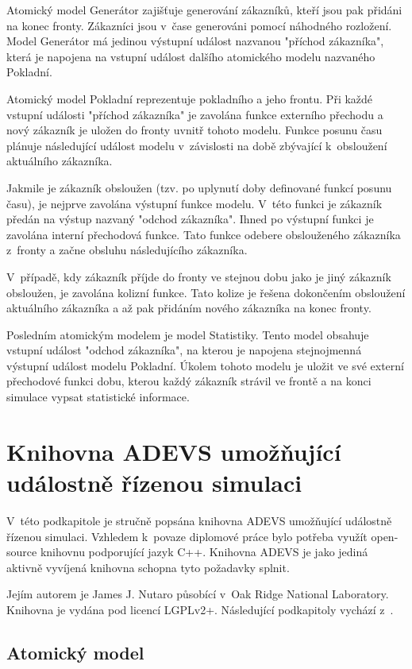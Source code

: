 Atomický model Generátor zajišťuje generování zákazníků, kteří jsou pak přidáni na konec fronty. Zákazníci jsou v~čase generováni pomocí náhodného rozložení. Model Generátor má jedinou výstupní událost nazvanou "příchod zákazníka", která je napojena na vstupní událost dalšího atomického modelu nazvaného Pokladní.

Atomický model Pokladní reprezentuje pokladního a jeho frontu. Při každé vstupní události "příchod zákazníka" je zavolána funkce externího přechodu a nový zákazník je uložen do fronty uvnitř tohoto modelu. Funkce posunu času plánuje následující událost modelu v~závislosti na době zbývající k~obsloužení aktuálního zákazníka.

Jakmile je zákazník obsloužen (tzv. po uplynutí doby definované funkcí posunu času), je nejprve zavolána výstupní funkce modelu. V~této funkci je zákazník předán na výstup nazvaný "odchod zákazníka". Ihned po výstupní funkci je zavolána interní přechodová funkce. Tato funkce odebere obslouženého zákazníka z~fronty a začne obsluhu následujícího zákazníka.

V~případě, kdy zákazník příjde do fronty ve stejnou dobu jako je jiný zákazník obsloužen, je zavolána kolizní funkce. Tato kolize je řešena dokončením obsloužení aktuálního zákazníka a až pak přidáním nového zákazníka na konec fronty.

Posledním atomickým modelem je model Statistiky. Tento model obsahuje vstupní událost "odchod zákazníka", na kterou je napojena stejnojmenná výstupní událost modelu Pokladní. Úkolem tohoto modelu je uložit ve své externí přechodové funkci dobu, kterou každý zákazník strávil ve frontě a na konci simulace vypsat statistické informace.

\section{Knihovna ADEVS umožňující událostně řízenou simulaci}

V~této podkapitole je stručně popsána knihovna ADEVS umožňující událostně řízenou simulaci. Vzhledem k~povaze diplomové práce bylo potřeba využít open-source knihovnu podporující jazyk C++. Knihovna ADEVS je jako jediná aktivně vyvíjená knihovna schopna tyto požadavky splnit.

Jejím autorem je James J. Nutaro působící v~Oak Ridge National Laboratory. Knihovna je vydána pod licencí LGPLv2+. Následující podkapitoly vychází z~\cite{adevs}.

\subsection{Atomický model}

